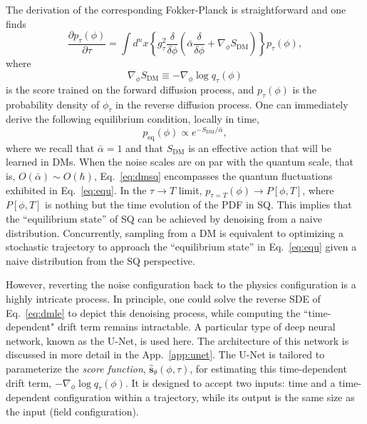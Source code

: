 The derivation of the corresponding Fokker-Planck is straightforward and one finds
\begin{equation}
    \frac{\partial p_{\tau}(\phi)}{\partial \tau} = 
    \int d^nx \left\{g^2_{\tau}  \frac{\delta}{\delta \phi}
    \left( \bar{\alpha}\frac{\delta }{\delta \phi} + \nabla_\phi S_\text{DM} \right)\right\} p_{\tau}(\phi),
    \label{eq:fp}
\end{equation}
where 
\begin{equation}
  \nabla_\phi S_\text{DM}\equiv -\nabla_\phi \log{q_{\tau}(\phi)}    
\end{equation}
is the score trained on the forward diffusion process, and $p_{\tau}(\phi)$ is the probability density of $\phi_{\tau}$ in the reverse diffusion process. One can immediately derive the following equilibrium condition, locally in time, 
\begin{equation}
    p_\text{eq}(\phi) \propto e^ {-S_\text{DM}/\bar{\alpha}},
    \label{eq:dmsq}
\end{equation}
where we recall that $\bar\alpha=1$ and that $S_\text{DM}$ is an effective action that will be learned in DMs. When the noise scales are on par with the quantum scale, that is, $O(\bar{\alpha})\sim O(\hbar)$, Eq.~\eqref{eq:dmsq} encompasses the quantum fluctuations exhibited in Eq.~\eqref{eq:equ}. In the $\tau\rightarrow T$ limit, $ p_{\tau=T}(\phi) \rightarrow P[\phi,T]$, where $P[\phi,T]$ is nothing but the time evolution of the PDF in SQ. This implies that the “equilibrium state” of SQ can be achieved by denoising from a naive distribution. Concurrently, sampling from a DM is equivalent to optimizing a stochastic trajectory to approach the “equilibrium state” in Eq.~\eqref{eq:equ} given a naive distribution from the SQ perspective.

However, reverting the noise configuration back to the physics configuration is a highly intricate process. In principle, one could solve the reverse SDE of Eq.~\eqref{eq:dmle} to depict this denoising process, while computing the ``time-dependent" drift term remains intractable. A particular type of deep neural network, known as the U-Net, is used here. The architecture of this network is discussed in more detail in the App.~\ref{app:unet}. The U-Net is tailored to parameterize the \textit{score function}, $\hat{\mathbf{s}}_\theta(\phi,\tau)$, for estimating this time-dependent drift term, $-\nabla_\phi \log{q_{\tau}(\phi)}$. It is designed to accept two inputs: time and a time-dependent configuration within a trajectory, while its output is the same size as the input (field configuration).

